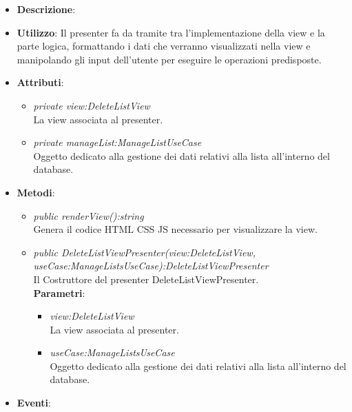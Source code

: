 \begin{itemize}
\item \textbf{Descrizione}: 
\item \textbf{Utilizzo}: Il presenter fa da tramite tra l'implementazione della view e la parte logica, formattando i dati che verranno visualizzati nella view e manipolando gli input dell'utente per eseguire le operazioni predisposte.
\item \textbf{Attributi}: 
	\begin{itemize}
	\item \textit{private view:DeleteListView}\\
		La view associata al presenter.
	\item \textit{private manageList:ManageListUseCase}\\
				Oggetto dedicato alla gestione dei dati relativi alla lista all'interno del database.
	\end{itemize}
\item \textbf{Metodi}:
	\begin{itemize}
	\item \textit{public renderView():string}\\
	Genera il codice HTML CSS JS necessario per visualizzare la view.
	\item \textit{public DeleteListViewPresenter(view:DeleteListView, useCase:ManageListsUseCase):DeleteListViewPresenter}\\
	Il Costruttore del presenter DeleteListViewPresenter.
		\\ \textbf{Parametri}: \begin{itemize}
		\item \textit{view:DeleteListView}\\
			La view associata al presenter.
		\item \textit{useCase:ManageListsUseCase}\\
			Oggetto dedicato alla gestione dei dati relativi alla lista all'interno del database.
		\end{itemize} 
	\end{itemize}
\item \textbf{Eventi}:
\end{itemize}